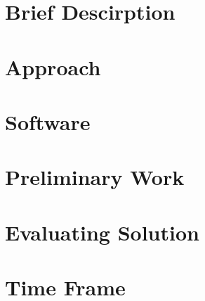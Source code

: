 \documentclass{article}
\title{Writing #3}
\author{Jacob Larson}
\begin{document}
\maketitle


\section*{Brief Descirption}
\section*{Approach}
\section*{Software}
\section*{Preliminary Work}
\section*{Evaluating Solution}
\section*{Time Frame}
\end{document}
